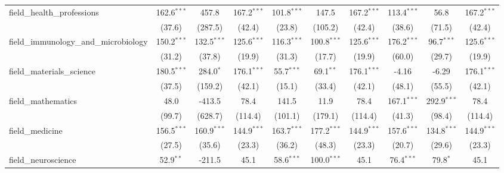 \begin{tabular}{lccccccccc}
   field\_health\_professions                                  & 162.6$^{***}$   & 457.8           & 167.2$^{***}$  & 101.8$^{***}$ & 147.5         & 167.2$^{***}$  & 113.4$^{***}$  & 56.8          & 167.2$^{***}$\\   
                                                               & (37.6)          & (287.5)         & (42.4)         & (23.8)        & (105.2)       & (42.4)         & (38.6)         & (71.5)        & (42.4)\\   
   field\_immunology\_and\_microbiology                        & 150.2$^{***}$   & 132.5$^{***}$   & 125.6$^{***}$  & 116.3$^{***}$ & 100.8$^{***}$ & 125.6$^{***}$  & 176.2$^{***}$  & 96.7$^{***}$  & 125.6$^{***}$\\   
                                                               & (31.2)          & (37.8)          & (19.9)         & (31.3)        & (17.7)        & (19.9)         & (60.0)         & (29.7)        & (19.9)\\   
   field\_materials\_science                                   & 180.5$^{***}$   & 284.0$^{*}$     & 176.1$^{***}$  & 55.7$^{***}$  & 69.1$^{**}$   & 176.1$^{***}$  & -4.16          & -6.29         & 176.1$^{***}$\\   
                                                               & (37.5)          & (159.2)         & (42.1)         & (15.1)        & (33.4)        & (42.1)         & (48.1)         & (55.5)        & (42.1)\\   
   field\_mathematics                                          & 48.0            & -413.5          & 78.4           & 141.5         & 11.9          & 78.4           & 167.1$^{***}$  & 292.9$^{***}$ & 78.4\\   
                                                               & (99.7)          & (628.7)         & (114.4)        & (101.1)       & (179.1)       & (114.4)        & (41.3)         & (98.4)        & (114.4)\\   
   field\_medicine                                             & 156.5$^{***}$   & 160.9$^{***}$   & 144.9$^{***}$  & 163.7$^{***}$ & 177.2$^{***}$ & 144.9$^{***}$  & 157.6$^{***}$  & 134.8$^{***}$ & 144.9$^{***}$\\   
                                                               & (27.5)          & (35.6)          & (23.3)         & (36.2)        & (48.3)        & (23.3)         & (20.7)         & (29.6)        & (23.3)\\   
   field\_neuroscience                                         & 52.9$^{**}$     & -211.5          & 45.1           & 58.6$^{***}$  & 100.0$^{***}$ & 45.1           & 76.4$^{***}$   & 79.8$^{*}$    & 45.1\\   

\end{tabular}
